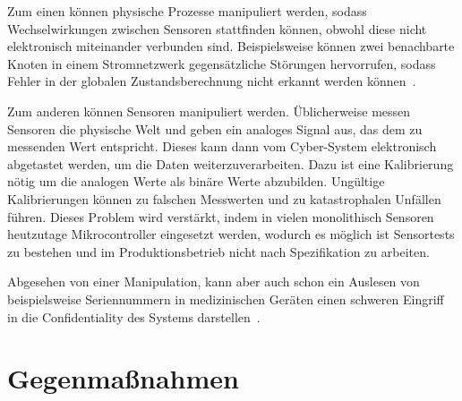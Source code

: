 \documentclass[final,bibliography=totocnumbered]{include/sikseminar}
\newcommand{\cps}{\glspl{cps}\xspace}
\begin{document}
    Zum einen können physische Prozesse manipuliert werden, sodass Wechselwirkungen zwischen Sensoren stattfinden können, obwohl diese nicht elektronisch miteinander verbunden sind.
    Beispielsweise können zwei benachbarte Knoten in einem Stromnetzwerk gegensätzliche Störungen hervorrufen, sodass Fehler in der globalen Zustandsberechnung nicht erkannt werden können~\cite{KLG15}.

    Zum anderen können Sensoren manipuliert werden.
    Üblicherweise messen Sensoren die physische Welt und geben ein analoges Signal aus, das dem zu messenden Wert entspricht.
    Dieses kann dann vom Cyber-System elektronisch abgetastet werden, um die Daten weiterzuverarbeiten.
    Dazu ist eine Kalibrierung nötig um die analogen Werte als binäre Werte abzubilden.
    Ungültige Kalibrierungen können zu falschen Messwerten und zu katastrophalen Unfällen führen.
    Dieses Problem wird verstärkt, indem in vielen monolithisch Sensoren heutzutage Mikrocontroller eingesetzt werden, wodurch es möglich ist Sensortests zu bestehen und im Produktionsbetrieb nicht nach Spezifikation zu arbeiten.~\cite{KLG15}

    Abgesehen von einer Manipulation, kann aber auch schon ein Auslesen von beispielsweise Seriennummern in medizinischen Geräten einen schweren Eingriff in die Confidentiality des Systems darstellen~\cite{HLL+17}.



    \section{Gegenmaßnahmen}\label{sec:gegenmassnahmen}
\end{document}
